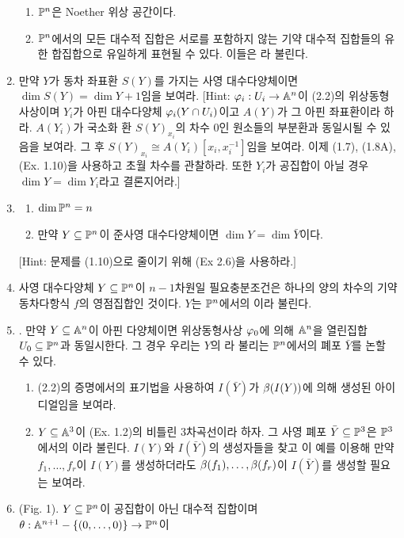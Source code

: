\begin{enumerate}[label=\tb{2.\arabic*.},itemindent=0mm,itemsep=2mm]
\begin{enumerate}[label=(\alph*)]
	\item $\mathbb{P}^n$은 Noether 위상 공간이다.
	\item $\mathbb{P}^n$에서의 모든 대수적 집합은 서로를 포함하지 않는 기약 대수적 집합들의
	유한 합집합으로 유일하게 표현될 수 있다. 이들은 라 불린다.
	\end{enumerate}
	\item 만약 $Y$가 동차 좌표환 $S(Y)$를 가지는 사영 대수다양체이면 $\dim S(Y)=\dim Y+1$임을 보여라.
	[Hint: $\varphi_i:U_i\rightarrow\mathbb{A}^n$이 (2.2)의 위상동형사상이며
	$Y_i$가 아핀 대수다양체 $\varphi_i(Y\cap U_i)$이고 $A(Y)$가 그 아핀 좌표환이라 하라.
	$A(Y_i)$가 국소화 환 $S(Y)_{x_i}$의 차수 0인 원소들의 부분환과 동일시될 수 있음을 보여라.
	그 후 $S(Y)_{x_i}\cong A(Y_i)[x_i,x_i^{-1}]$임을 보여라.
	이제 (1.7), (1.8A), (Ex. 1.10)을 사용하고 초월 차수를 관찰하라.
	또한 $Y_i$가 공집합이 아닐 경우 $\dim Y=\dim Y_i$라고 결론지어라.]
	\item \begin{enumerate}[label=(\alph*)]
	\item $\dim\mathbb{P}^n=n$
	\item 만약 $Y\subseteq\mathbb{P}^n$이 준사영 대수다양체이면 $\dim Y=\dim\bar Y$이다.
	\end{enumerate}
	$[$Hint: 문제를 (1.10)으로 줄이기 위해 (Ex 2.6)을 사용하라.$]$
	\item 사영 대수다양체 $Y\subseteq\mathbb{P}^n$이 $n-1$차원일 필요충분조건은 하나의 양의 차수의 기약 동차다항식 $f$의 영점집합인 것이다.
	$Y$는 $\mathbb{P}^n$에서의 이라 불린다.
	\item {}. 만약 $Y\subseteq\mathbb{A}^n$이 아핀 다양체이면
	위상동형사상 $\varphi_0$에 의해 $\mathbb{A}^n$을 열린집합 $U_0\subseteq\mathbb{P}^n$과 동일시한다.
	그 경우 우리는 $Y$의 라 불리는 $\mathbb{P}^n$에서의 폐포 $\bar Y$를 논할 수 있다.
	\begin{enumerate}[label=(\alph*)]
	\item (2.2)의 증명에서의 표기법을 사용하여 $I(\bar Y)$가 $\beta(I(Y))$에 의해 생성된 아이디얼임을 보여라.
	\item $Y\subseteq\mathbb{A}^3$이 (Ex. 1.2)의 비틀린 3차곡선이라 하자.
	그 사영 폐포 $\bar Y\subseteq\mathbb{P}^3$은 $\mathbb{P}^3$에서의 이라 불린다.
	$I(Y)$와 $I(\bar Y)$의 생성자들을 찾고 이 예를 이용해 만약 $f_1,\ldots,f_r$이 $I(Y)$를 생성하더라도
	$\beta(f_1),\ldots,\beta(f_r)$이 $I(\bar Y)$를 생성할 필요는  보여라.
	\end{enumerate}
	\item {} (Fig. 1).
	$Y\subseteq\mathbb{P}^n$이 공집합이 아닌 대수적 집합이며 $\theta:\mathbb{A}^{n+1}-\{(0,\ldots,0)\}\rightarrow\mathbb{P}^n$이

\end{enumerate}
